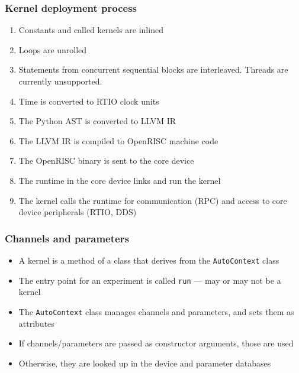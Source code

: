 \documentclass{beamer}
\begin{document}
\begin{frame}
\frametitle{\selectfont Kernel deployment process}
\begin{enumerate}
\item Constants and called kernels are inlined
\item Loops are unrolled
\item Statements from concurrent sequential blocks are interleaved. Threads are currently unsupported.
\item Time is converted to RTIO clock units
\item The Python AST is converted to LLVM IR
\item The LLVM IR is compiled to OpenRISC machine code
\item The OpenRISC binary is sent to the core device
\item The runtime in the core device links and run the kernel
\item The kernel calls the runtime for communication (RPC) and access to core device peripherals (RTIO, DDS)
\end{enumerate}
\end{frame}

\begin{frame}[fragile]
\frametitle{\selectfont Channels and parameters}
\begin{itemize}
\item A kernel is a method of a class that derives from the \verb!AutoContext! class
\item The entry point for an experiment is called \verb!run! --- may or may not be a kernel
\item The \verb!AutoContext! class manages channels and parameters, and sets them as attributes
\item If channels/parameters are passed as constructor arguments, those are used
\item Otherwise, they are looked up in the device and parameter databases
\end{itemize}
\end{frame}
\end{document}
